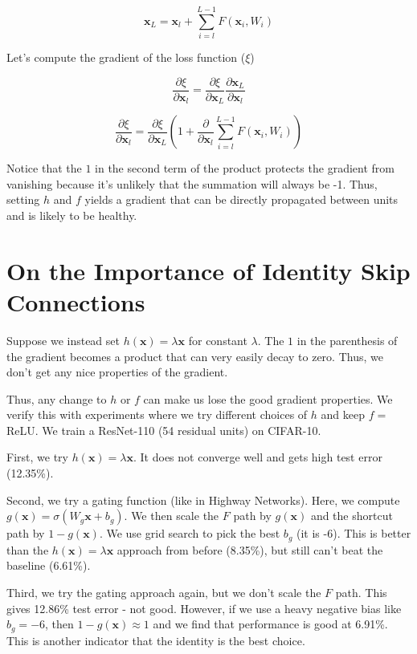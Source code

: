 \documentclass[a4paper]{article}
\begin{document}
$$
\mathbf{x}_L = \mathbf{x}_l + \sum_{i=l}^{L - 1}{F(\mathbf{x}_i, W_i)}
$$

Let's compute the gradient of the loss function ($\xi$)

$$
\frac{\partial \xi}{\partial \mathbf{x}_l} =
\frac{\partial \xi}{\partial \mathbf{x}_L}
\frac{\partial \mathbf{x}_L}{\partial \mathbf{x}_l}
$$

$$
\frac{\partial \xi}{\partial \mathbf{x}_l} =
\frac{\partial \xi}{\partial \mathbf{x}_L} (
1 + \frac{\partial}{\partial \mathbf{x}_l}
\sum_{i=l}^{L - 1}{F(\mathbf{x}_i, W_i)}
)
$$

Notice that the $1$ in the second term of the product protects the gradient
from vanishing because it's unlikely that the summation will always be -1. Thus,
setting $h$ and $f$ yields a gradient that can be directly propagated between
units and is likely to be healthy.

\section{On the Importance of Identity Skip Connections}
Suppose we instead set $h(\mathbf{x}) = \lambda \mathbf{x}$ for constant
$\lambda$. The $1$ in the parenthesis of the gradient becomes a product that
can very easily decay to zero. Thus, we don't get any nice properties of
the gradient.

Thus, any change to $h$ or $f$ can make us lose the good gradient properties.
We verify this with experiments where we try different choices of $h$ and keep
$f = $ ReLU. We train a ResNet-110 (54 residual units) on CIFAR-10.

First, we try $h(\mathbf{x}) = \lambda \mathbf{x}$. It does not converge well
and gets high test error (12.35\%).

Second, we try a gating function (like in Highway Networks). Here, we compute
$g(\mathbf{x}) = \sigma(W_g \mathbf{x} + b_g)$. We then scale the $F$ path
by $g(\mathbf{x})$ and the shortcut path by $1 - g(\mathbf{x})$. We use grid
search to pick the best $b_g$ (it is -6). This is better than the $h(\mathbf{x})
= \lambda \mathbf{x}$ approach from before (8.35\%), but still can't beat the
baseline (6.61\%).

Third, we try the gating approach again, but we don't scale the $F$ path. This
gives 12.86\% test error - not good. However, if we use a heavy negative bias
like $b_g = -6$, then $1 - g(\mathbf{x}) \approx 1$ and we find that performance
is good at 6.91\%. This is another indicator that the identity is the best
choice.
\end{document}

